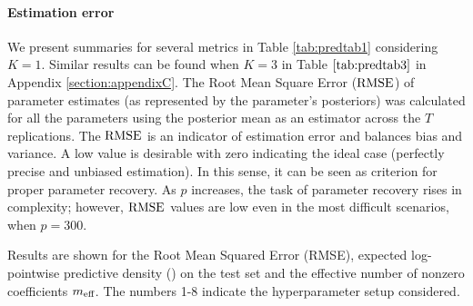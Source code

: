 \paragraph{Estimation error}\mbox{}

We present summaries for several metrics in Table \ref{tab:predtab1} considering $K=1$. Similar results can be found when $K=3$ in Table $\ref{tab:predtab3}$ in Appendix \ref{section:appendixC}. The Root Mean Square Error ($\text{RMSE}$) of parameter estimates (as represented by the parameter's posteriors) was calculated for all the parameters using the posterior mean as an estimator across the $T$ replications. The $\text{RMSE}$ is an indicator of estimation error and balances bias and variance. A low value is desirable with zero indicating the ideal case (perfectly precise and unbiased estimation). In this sense, it can be seen as criterion for proper parameter recovery. As $p$ increases, the task of parameter recovery rises in complexity; however, $\text{RMSE}$ values are low even in the most difficult scenarios, when $p=300$.

\begin{table}[t!]
\centering
\caption{Predictive Table results with $K=1$. }
\label{tab:predtab1}
 \begin{tablenotes}
      \small
      \item  Results are shown for the Root Mean Squared Error (RMSE), expected log-pointwise predictive density (\elpd) on the test set and the effective number of nonzero coefficients $m_{\text{eff} }$. The numbers 1-8 indicate the hyperparameter setup considered.
\end{tablenotes}
\end{table}

